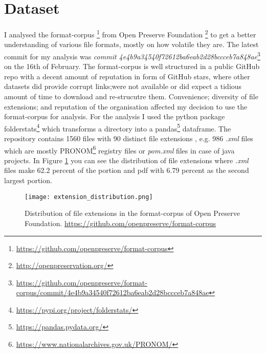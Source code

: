 \section{Dataset}
I analysed the format-corpus \footnote{\url{https://github.com/openpreserve/format-corpus}} from Open Preserve Foundation \footnote{\url{ http://openpreservation.org/}} to get a better understanding of various file formats, mostly on how volatile they are. The latest commit for my analysis was \textit{commit 4e4b9a34540f72612ba6eab2d28bccceb7a848ae}\footnote{\url{https://github.com/openpreserve/format-corpus/commit/4e4b9a34540f72612ba6eab2d28bccceb7a848ae}} on the 16th of February. The format-corpus is well structured in a public GitHub repo with a decent amount of reputation in form of GitHub stars, where other datasets did provide corrupt links;were not available or did expect a tidious amount of time to download and re-strucutre them. Convenience; diversity of file extensions; and reputation of the organisation affected my decision to use the format-corpus for analysis.
For the analysis I used the python package folderstats\footnote{\url{https://pypi.org/project/folderstats/}} which transforms a directory into a pandas\footnote{\url{https://pandas.pydata.org/}} dataframe. The repository contains 1560 files with 90 distinct file extensions , e.g. 986 \textit{.xml} files which are mostly PRONOM\footnote{\url{https://www.nationalarchives.gov.uk/PRONOM/}} registry files or \textit{pom.xml} files in case of java projects. In Figure \ref{fig:extension_distribution} you can see the distribution of file extensions where \textit{.xml} files make 62.2 percent of the portion and pdf with 6.79 percent as the second largest portion.
\begin{figure}[h]
    \label{fig:extension_distribution}
    \caption{Distribution of file extensions in the format-corpus of Open Preserve Foundation. \url{https://github.com/openpreserve/format-corpus}}
    \centering
    \texttt{[image: extension\_distribution.png]}
\end{figure}
